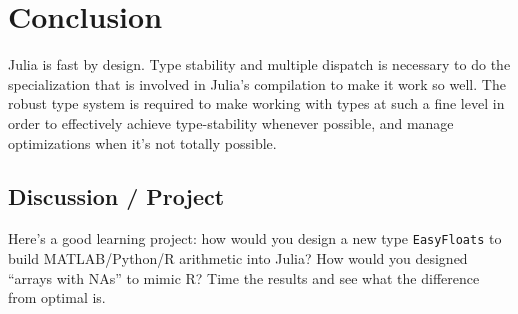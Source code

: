 \documentclass[11pt]{article}
\begin{document}
    \hypertarget{conclusion}{%
\section{Conclusion}\label{conclusion}}

Julia is fast by design. Type stability and multiple dispatch is
necessary to do the specialization that is involved in Julia's
compilation to make it work so well. The robust type system is required
to make working with types at such a fine level in order to effectively
achieve type-stability whenever possible, and manage optimizations when
it's not totally possible.

\hypertarget{discussion-project}{%
\subsection{Discussion / Project}\label{discussion-project}}

Here's a good learning project: how would you design a new type
\texttt{EasyFloats} to build MATLAB/Python/R arithmetic into Julia? How
would you designed ``arrays with NAs'' to mimic R? Time the results and
see what the difference from optimal is.


    
    
    
    
\end{document}
